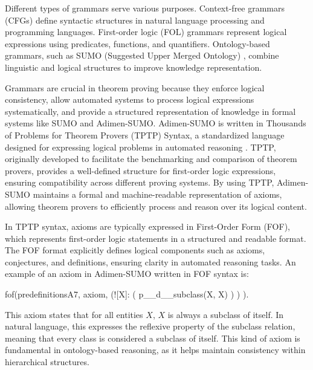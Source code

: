 \documentclass[english,version-2020-11]{uzl-thesis}
\begin{document}
Different types of grammars serve various purposes. Context-free grammars (CFGs) define syntactic structures in natural language processing and programming languages. First-order logic (FOL) grammars represent logical expressions using predicates, functions, and quantifiers. Ontology-based grammars, such as SUMO (Suggested Upper Merged Ontology) \cite{Niles2001}, combine linguistic and logical structures to improve knowledge representation.

Grammars are crucial in theorem proving because they enforce logical consistency, allow automated systems to process logical expressions systematically, and provide a structured representation of knowledge in formal systems like SUMO and Adimen-SUMO. Adimen-SUMO is written in Thousands of Problems for Theorem Provers (TPTP) Syntax, a standardized language designed for expressing logical problems in automated reasoning \cite{Alvez2014}. TPTP, originally developed to facilitate the benchmarking and comparison of theorem provers, provides a well-defined structure for first-order logic expressions, ensuring compatibility across different proving systems. By using TPTP, Adimen-SUMO maintains a formal and machine-readable representation of axioms, allowing theorem provers to efficiently process and reason over its logical content.

In TPTP syntax, axioms are typically expressed in First-Order Form (FOF), which represents first-order logic statements in a structured and readable format. The FOF format explicitly defines logical components such as axioms, conjectures, and definitions, ensuring clarity in automated reasoning tasks. An example of an axiom in Adimen-SUMO written in FOF syntax is:


\begin{Pseudocode}[morekeywords = {add, create}, deletekeywords={to}, numbers=left,
    caption = {Axiom example Adimen-SUMO}]
    fof(predefinitionsA7, axiom,
        (![X]: 
            (
                p__d__subclass(X, X)
            )
        )
    ).
\end{Pseudocode}



This axiom states that for all entities \( X \), \( X \) is always a subclass of itself. In natural language, this expresses the reflexive property of the subclass relation, meaning that every class is considered a subclass of itself. This kind of axiom is fundamental in ontology-based reasoning, as it helps maintain consistency within hierarchical structures.
\end{document}
